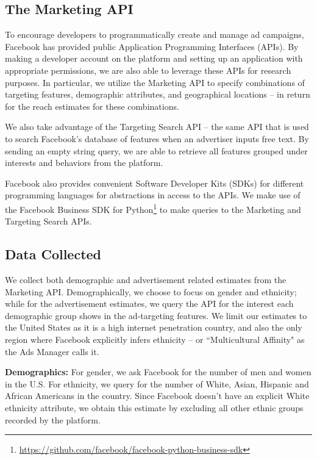 \subsection{The Marketing API} \label{subsec:marketing_api}
To encourage developers to programmatically create and manage ad campaigns, Facebook has provided public Application Programming Interfaces (APIs). By making a developer account on the platform and setting up an application with appropriate permissions, we are also able to leverage these APIs for research purposes. In particular, we utilize the Marketing API to specify combinations of targeting features, demographic attributes, and geographical locations -- in return for the reach estimates for these combinations.

We also take advantage of the Targeting Search API -- the same API that is used to search Facebook's database of features when an advertiser inputs free text. By sending an empty string query, we are able to retrieve all features grouped under interests and behaviors from the platform.

Facebook also provides convenient Software Developer Kits (SDKs) for different programming languages for abstractions in access to the APIs. We make use of the Facebook Business SDK for Python\footnote{\url{https://github.com/facebook/facebook-python-business-sdk}} to make queries to the Marketing and Targeting Search APIs.

\subsection{Data Collected} \label{subsec:data_collected}
We collect both demographic and advertisement related estimates from the Marketing API. Demographically, we choose to focus on gender and ethnicity; while for the advertisement estimates, we query the API for the interest each demographic group shows in the ad-targeting features. We limit our estimates to the United States as it is a high internet penetration country, and also the only region where Facebook explicitly infers ethnicity -- or ``Multicultural Affinity" as the Ads Manager calls it.

\textbf{Demographics:} For gender, we ask Facebook for the number of men and women in the U.S. For ethnicity, we query for the number of White, Asian, Hispanic and African Americans in the country. Since Facebook doesn't have an explicit White ethnicity attribute, we obtain this estimate by excluding all other ethnic groups recorded by the platform.

